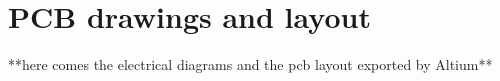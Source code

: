 \chapter{PCB drawings and layout}\label{appx:pcb}

**here comes  the electrical diagrams and the pcb layout exported by Altium**
